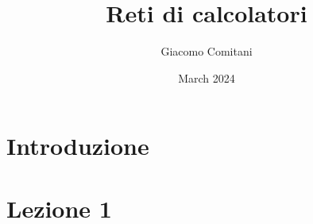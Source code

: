 \documentclass{article}
\title{Reti di calcolatori}
\author{Giacomo Comitani}
\date{March 2024}
\begin{document}
\maketitle

\tableofcontents
\section{Introduzione}

\section{Lezione 1}
\end{document}
